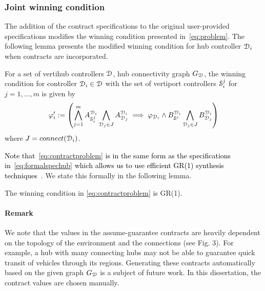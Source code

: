 \subsubsection{Joint winning condition}
The addition of the contract specifications to the original user-provided specifications modifies the winning condition presented in~\eqref{eq:problem}. The following lemma presents the modified winning condition for hub controller $\mathcal{D}_i$ when contracts are incorporated. 
\begin{lemma}
For a set of vertihub controllers $\mathcal{D}$, hub connectivity graph $G_{\mathcal{D}}$, the winning condition for controller $\mathcal{D}_i \in \mathcal{D}$ with the set of vertiport controllers $\mathcal{S}_i^j$ for $j = 1,\ldots,m$ is given by
\begin{equation}\label{eq:contractproblem}
     \varphi_{i}' := \left( \bigwedge_{j=1}^{m} A_{\mathcal{S}_i^j}^{\mathcal{D}_i} \bigwedge_{\mathcal{D}_j\in J} A_{\mathcal{D}_j}^{\mathcal{D}_i} \implies \varphi_{\mathcal{D}_i} \wedge B_{\mathcal{S}^i}^{\mathcal{D}_i} \bigwedge_{\mathcal{D}_j\in J} B_{\mathcal{D}_j}^{\mathcal{D}_i} \right)
\end{equation}
where $J = connect(\mathcal{D}_i)$.
\end{lemma}
\textcolor{black}{Note that~\eqref{eq:contractproblem} is in the same form as the specifications in~\eqref{eq:formalspechub} which allows us to use efficient GR(1) synthesis techniques~\cite{bloem2012}.} We state this formally in the following lemma. 
\begin{lemma}\label{lemma:gr1}
The winning condition in \eqref{eq:contractproblem} is GR(1).
\end{lemma}


\paragraph*{\textbf{Remark}} We note that the values in the assume-guarantee contracts are heavily dependent on the topology of the environment and the connections (see Fig. 3). For example, a hub with many connecting hubs may not be able to guarantee quick transit of vehicles through its regions. Generating these contracts automatically based on the given graph $G_{\mathcal{D}}$ is a subject of future work. In this dissertation, the contract values are chosen manually. 


